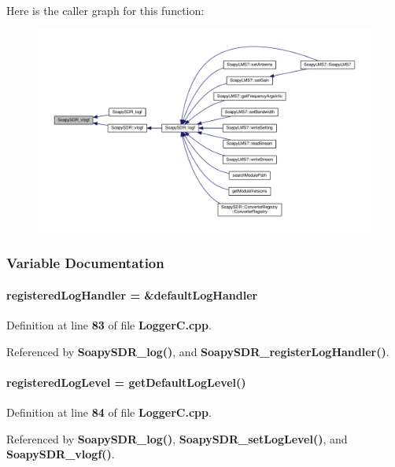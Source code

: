 Here is the caller graph for this function\+:
\nopagebreak
\begin{figure}[H]
\begin{center}
\leavevmode
\includegraphics[width=350pt]{df/da4/LoggerC_8cpp_a248420cecff1110e0d9d374ece35f61f_icgraph}
\end{center}
\end{figure}




\subsubsection{Variable Documentation}
\paragraph[{registered\+Log\+Handler}]{ registered\+Log\+Handler = \&{\bf default\+Log\+Handler}\hspace{0.3cm}{\ttfamily [static]}}\label{LoggerC_8cpp_a6ef5b5fad65ea225c8402479c85179d1}


Definition at line {\bf 83} of file {\bf Logger\+C.\+cpp}.



Referenced by {\bf Soapy\+S\+D\+R\+\_\+log()}, and {\bf Soapy\+S\+D\+R\+\_\+register\+Log\+Handler()}.

\paragraph[{registered\+Log\+Level}]{ registered\+Log\+Level = {\bf get\+Default\+Log\+Level}()\hspace{0.3cm}{\ttfamily [static]}}\label{LoggerC_8cpp_afb71b465835eeba746c68498b61e6cb5}


Definition at line {\bf 84} of file {\bf Logger\+C.\+cpp}.



Referenced by {\bf Soapy\+S\+D\+R\+\_\+log()}, {\bf Soapy\+S\+D\+R\+\_\+set\+Log\+Level()}, and {\bf Soapy\+S\+D\+R\+\_\+vlogf()}.

